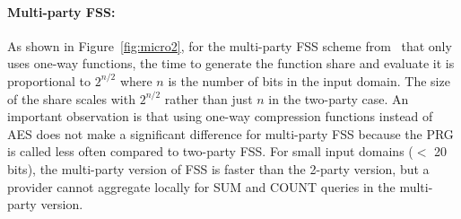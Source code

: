\paragraph{Multi-party FSS:}
As shown in Figure~\ref{fig:micro2}, for the multi-party FSS 
scheme from~\cite{fss} that only uses one-way functions, 
the time to generate the function share and evaluate it is proportional
to $2^{n/2}$ where $n$ is the number of bits in the input domain. 
The size of the share scales with $2^{n/2}$
rather than just $n$ in the two-party case. 
An important observation
is that using one-way compression 
functions instead of AES does not make a significant difference for multi-party 
FSS because the PRG is called
less often compared to two-party FSS. 
For small input domains ($<$ 20 bits),
the multi-party version of FSS is faster than the 2-party version, but 
a provider cannot aggregate locally for SUM and COUNT queries in the multi-party version.

%

